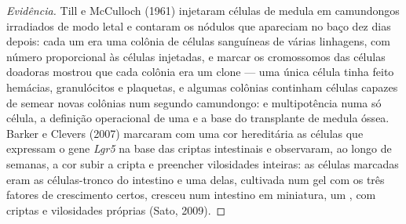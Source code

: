 \begin{proof}[Evidência]
Till e McCulloch (1961) injetaram células de medula em camundongos
irradiados de modo letal e contaram os nódulos que apareciam no baço dez
dias depois: cada um era uma colônia de células sanguíneas de várias
linhagens, com número proporcional às células injetadas, e marcar os
cromossomos das células doadoras mostrou que cada colônia era um clone
--- uma única célula tinha feito hemácias, granulócitos e plaquetas, e
algumas colônias continham células capazes de semear novas colônias num
segundo camundongo:  e multipotência numa só célula, a
definição operacional de uma  e a base do transplante de
medula óssea. Barker e Clevers (2007) marcaram com uma cor hereditária as
células que expressam o gene \emph{Lgr5} na base das criptas intestinais
e observaram, ao longo de semanas, a cor subir a cripta e preencher
vilosidades inteiras: as células marcadas eram as células-tronco do
intestino e uma delas, cultivada num gel com os três fatores de
crescimento certos, cresceu num intestino em miniatura, um
\emph{}, com criptas e vilosidades próprias (Sato, 2009).
\end{proof}


